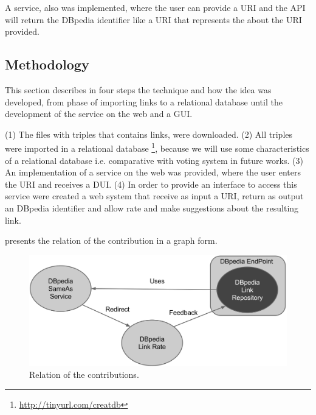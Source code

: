 A service, also was implemented, where the user can provide a URI and the API will return the DBpedia identifier like a URI that represents the  about the URI provided.

\subsection{Methodology}
This section describes in four steps the technique and how the idea was developed, from phase of importing links to a relational database until the development of the service on the web and a GUI.

(1) The files with triples that contains  links, were downloaded.
(2) All triples were imported in a relational database \footnote{\url{http://tinyurl.com/creatdb}}, because we will use some characteristics of a relational database i.e. comparative with voting system in future works.
(3) An implementation of a service on the web was provided, where the user enters the URI and receives a DUI.
(4) In order to provide an interface to access this service were created a web system that receive as input a URI, return as output an DBpedia identifier and allow rate and make suggestions about the resulting link.


 presents the relation of the contribution in a graph form.

\begin{figure}[hbt] 
  	\centering
	\includegraphics[width=\columnwidth]{img/contribution.png}
  	\caption{Relation of the contributions.}
  	\label{fig:contrib}
\end{figure}

